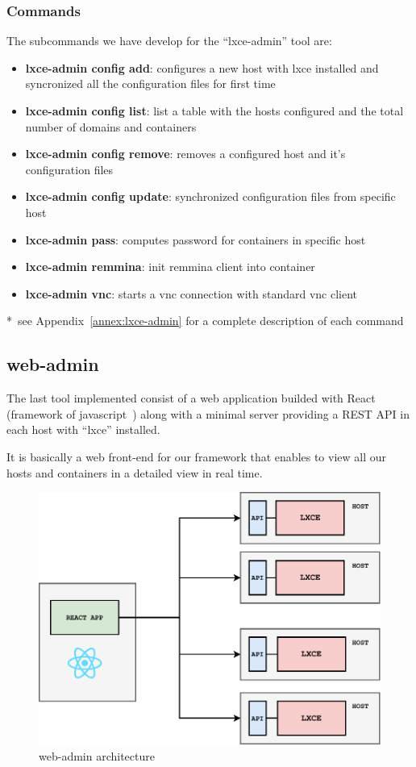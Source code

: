 \subsubsection{Commands}
The subcommands we have develop for the ``lxce-admin'' tool are:
\begin{itemize}
	\item{\textbf{lxce-admin config add}: configures a new host with lxce installed and syncronized all the configuration files for first time}
	\item{\textbf{lxce-admin config list}: list a table with the hosts configured and the total number of domains and containers}
	\item{\textbf{lxce-admin config remove}: removes a configured host and it's configuration files}
	\item{\textbf{lxce-admin config update}: synchronized configuration files from specific host}
	\item{\textbf{lxce-admin pass}: computes password for containers in specific host}
	\item{\textbf{lxce-admin remmina}: init remmina client into container}
	\item{\textbf{lxce-admin vnc}: starts a vnc connection with standard vnc client}
\end{itemize}
*~see Appendix~\ref{annex:lxce-admin} for a complete description of each command

\newpage
\subsection{web-admin}
The last tool implemented consist of a web application builded with React (framework of javascript~\cite{react}) along with a minimal server providing a REST API in each host with ``lxce'' installed.

It is basically a web front-end for our framework that enables to view all our hosts and containers in a detailed view in real time.

\begin{figure}[H]
	\label{fig:Web admin architecture}
	\centering
	\includegraphics{img/03/web-admin-diagram.pdf}
	\caption[web-admin architecture]{\footnotesize{web-admin architecture}}
\end{figure}

